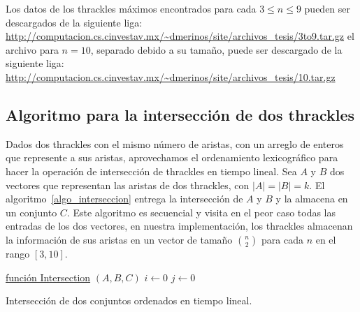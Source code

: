 
  Los datos de los thrackles máximos encontrados para cada $ 3\leq n \leq 9$
  pueden ser descargados de la siguiente liga:
  \url{http://computacion.cs.cinvestav.mx/~dmerinos/site/archivos_tesis/3to9.tar.gz}
  el archivo para $n=10$, separado debido a su tamaño,
   puede ser descargado de la siguiente liga:
  \url{http://computacion.cs.cinvestav.mx/~dmerinos/site/archivos_tesis/10.tar.gz}

\subsection{Algoritmo para la intersección de dos thrackles}\label{secc:algo_interseccion_thrackles}
  Dados dos thrackles con el mismo número de aristas, con un arreglo de enteros que
  represente a sus aristas, aprovechamos el ordenamiento lexicográfico para hacer la
  operación de intersección de thrackles en tiempo lineal.
  Sea $A$ y $B$ dos vectores que representan las aristas de dos thrackles, con
  $|A|=|B|=k$. El algoritmo~\ref{algo_interseccion} entrega la intersección de $A$ y $B$
  y la almacena en un conjunto $C$. Este algoritmo es secuencial y visita en el peor caso
  todas las entradas de los dos vectores, en nuestra implementación, los thrackles
  almacenan la información de sus aristas en un vector de tamaño $\binom{n}{2}$ para cada
  $n$ en el rango $[3,10]$.
  \begin{algorithm}[]
    \DontPrintSemicolon
    \underline{función Intersection} $(A,B,C)$\;
      $i\gets 0$\;
      $j\gets 0$\;
    \caption{Intersección de dos conjuntos ordenados en tiempo
    lineal.}
    \label{algo_interseccion}
  \end{algorithm}

